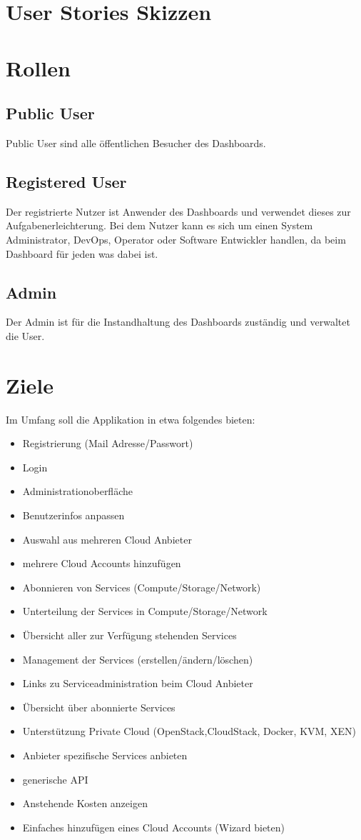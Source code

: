 \section{User Stories Skizzen}
\section{Rollen}
\subsection{Public User}
Public User sind alle öffentlichen Besucher des Dashboards.

\subsection{Registered User}
Der registrierte Nutzer ist Anwender des Dashboards und verwendet dieses zur 
Aufgabenerleichterung.
Bei dem Nutzer kann es sich um einen System Administrator, DevOps, Operator oder
Software Entwickler handlen, da beim Dashboard für jeden was dabei ist.

\subsection{Admin}
Der Admin ist für die Instandhaltung des Dashboards zuständig und verwaltet die 
User.

\section{Ziele}
Im Umfang soll die Applikation in etwa folgendes bieten:
\begin{itemize}
  \item Registrierung (Mail Adresse/Passwort)
  \item Login
  \item Administrationoberfläche
  \item Benutzerinfos anpassen
  \item Auswahl aus mehreren Cloud Anbieter
  \item mehrere Cloud Accounts hinzufügen
  \item Abonnieren von Services (Compute/Storage/Network)
  \item Unterteilung der Services in Compute/Storage/Network
  \item Übersicht aller zur Verfügung stehenden Services
  \item Management der Services (erstellen/ändern/löschen)
  \item Links zu Serviceadministration beim Cloud Anbieter
  \item Übersicht über abonnierte Services
  \item Unterstützung Private Cloud (OpenStack,CloudStack, Docker, KVM, XEN)
  \item Anbieter spezifische Services anbieten
  \item generische API
  \item Anstehende Kosten anzeigen
  \item Einfaches hinzufügen eines Cloud Accounts (Wizard bieten)
\end{itemize}


